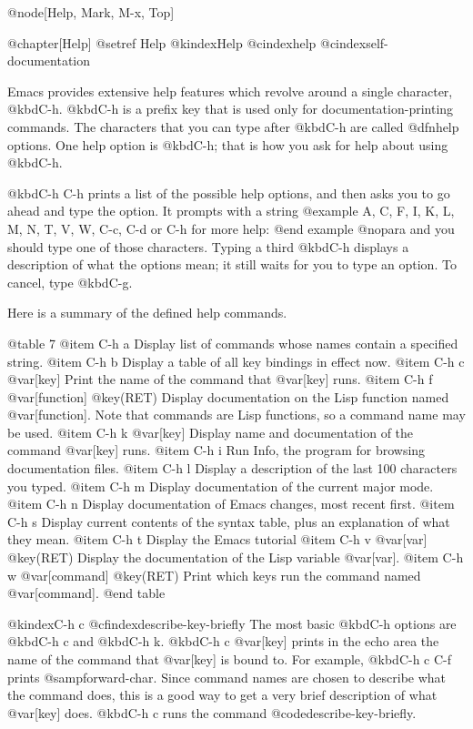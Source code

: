 {{{{@node[Help, Mark, M-x, Top]

@chapter[Help]
@setref Help
@kindex{Help}
@cindex{help}
@cindex{self-documentation}

  Emacs provides extensive help features which revolve around
a single character, @kbd{C-h}.  @kbd{C-h} is a prefix key that is used
only for documentation-printing commands.  The characters that you can type
after @kbd{C-h} are called @dfn{help options}.  One help option is
@kbd{C-h}; that is how you ask for help about using @kbd{C-h}.

  @kbd{C-h C-h} prints a list of the possible help options, and then asks
you to go ahead and type the option.  It prompts with a string
@example
A, C, F, I, K, L, M, N, T, V, W, C-c, C-d or C-h for more help: 
@end example
@nopara
and you should type one of those characters.  Typing a third @kbd{C-h}
displays a description of what the options mean; it still waits for
you to type an option.  To cancel, type @kbd{C-g}.

  Here is a summary of the defined help commands.

@table 7
@item C-h a
Display list of commands whose names contain a specified string.
@item C-h b
Display a table of all key bindings in effect now.
@item C-h c @var[key]
Print the name of the command that @var[key] runs.
@item C-h f @var[function] @key(RET)
Display documentation on the Lisp function named @var[function].
Note that commands are Lisp functions, so a command name may be used.
@item C-h k @var[key]
Display name and documentation of the command @var[key] runs.
@item C-h i
Run Info, the program for browsing documentation files.
@item C-h l
Display a description of the last 100 characters you typed.
@item C-h m
Display documentation of the current major mode.
@item C-h n
Display documentation of Emacs changes, most recent first.
@item C-h s
Display current contents of the syntax table, plus an explanation
of what they mean.
@item C-h t
Display the Emacs tutorial
@item C-h v @var[var] @key(RET)
Display the documentation of the Lisp variable @var[var].
@item C-h w @var[command] @key(RET)
Print which keys run the command named @var[command].
@end table

@kindex{C-h c}
@cfindex{describe-key-briefly}
  The most basic @kbd{C-h} options are @kbd{C-h c} and @kbd{C-h k}.
@kbd{C-h c @var[key]} prints in the echo area the name of
the command that @var[key] is bound to.  For example, @kbd{C-h c C-f}
prints @samp{forward-char}.  Since command names are chosen to describe
what the command does, this is a good way to get a very brief description
of what @var[key] does.  @kbd{C-h c} runs the command @code{describe-key-briefly}.

}}}}
